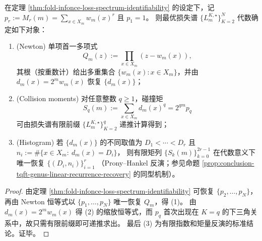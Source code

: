 \begin{corollary}\label{cor:fold-infonce-loss-tower-newton-prony-completeness}
在定理 \ref{thm:fold-infonce-loss-spectrum-identifiability} 的设定下，记 \(p_r:=M_r(m)=\sum_{x\in X_m}w_m(x)^r\) 且 \(p_1=1\)。
则最优损失谱 \(\{L_m^{K,\star}\}_{K=2}^{N}\) 代数确定如下对象：
\begin{enumerate}
  \item \textnormal{(Newton)} 单项首一多项式
  \[
  Q_m(z):=\prod_{x\in X_m}(z-w_m(x)),
  \]
  其根（按重数计）给出多重集合 \(\{w_m(x):x\in X_m\}\)，并由 \(d_m(x)=2^m w_m(x)\) 恢复 \(\{d_m(x)\}\)；
  \item \textnormal{(Collision moments)} 对任意整数 \(q\ge 1\)，碰撞矩
  \[
  S_q(m):=\sum_{x\in X_m}d_m(x)^q
  =2^{qm}p_q
  \]
  可由损失谱有限前缀 \(\{L_m^{K,\star}\}_{K=2}^{q}\) 递推计算得到；
  \item \textnormal{(Histogram)} 若 \(\{d_m(x)\}\) 的不同取值为 \(D_1<\cdots<D_r\) 且
  \(n_i:=\#\{x\in X_m:\ d_m(x)=D_i\}\)，
  则有限矩列 \(\{S_k(m)\}_{k=0}^{2r-1}\) 在代数意义下唯一恢复 \(\{(D_i,n_i)\}_{i=1}^{r}\)
  （Prony--Hankel 反演；参见命题 \ref{prop:conclusion-tqft-genus-linear-recurrence-recovery} 的同型机制）。
\end{enumerate}
\end{corollary}
\begin{proof}
由定理 \ref{thm:fold-infonce-loss-spectrum-identifiability} 可恢复 \(\{p_2,\dots,p_N\}\)，再由 Newton 恒等式以 \(\{p_1,\dots,p_N\}\) 唯一恢复 \(Q_m\)，得 (1)。
由 \(d_m(x)=2^m w_m(x)\) 得 (2) 的缩放恒等式，而 \(p_q\) 首次出现在 \(K=q\) 的下三角关系中，故只需有限前缀即可递推求出。
最后 (3) 为有限指数和矩量反演的标准结论。证毕。
\end{proof}

